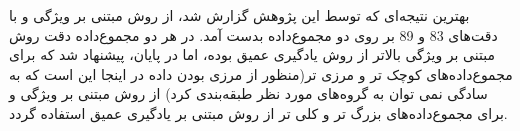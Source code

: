 بهترین نتیجه‌ای که توسط این پژوهش گزارش شد، از روش مبتنی بر ویژگی و با دقت‌های 83 و 89 بر روی دو مجموع‌داده بدست آمد.
در هر دو مجموع‌داده دقت روش مبتنی بر ویژگی بالاتر از روش یادگیری عمیق بوده، اما در پایان، پیشنهاد شد که برای مجموع‌داده‌های کوچک تر و مرزی تر(منظور از مرزی بودن داده در اینجا این است که به سادگی نمی توان به گروه‌های مورد نظر طبقه‌بندی کرد) از روش مبتنی بر ویژگی و برای مجموع‌داده‌های بزرگ تر و کلی تر از روش مبتنی بر یادگیری عمیق استفاده گردد.